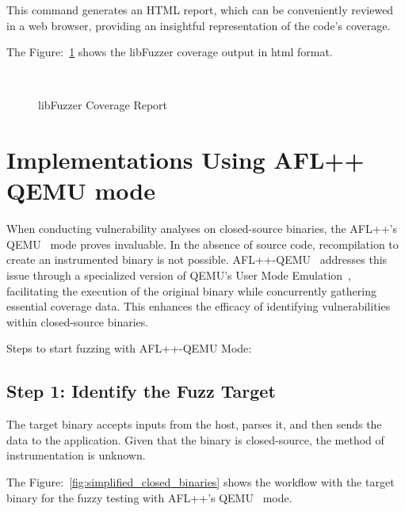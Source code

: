 This command generates an HTML report, which can be conveniently reviewed in a web browser,
providing an insightful representation of the code's coverage.

The Figure:~\ref{fig:llvm_cov_report} shows the libFuzzer coverage output in html format.

\begin{figure}[H]
    \centering
    {}
    \caption{libFuzzer Coverage Report}~\label{fig:llvm_cov_report}
\end{figure}

\section{Implementations Using AFL++ QEMU mode}

When conducting vulnerability analyses on closed-source binaries, the
AFL++'s QEMU~\cite{AFLplusp57:online} mode proves invaluable. In the absence of
source code, recompilation to create an instrumented binary is not possible.
AFL++-QEMU~\cite{AFLplusp57:online} addresses this issue through
a specialized version of QEMU's User Mode Emulation~\cite{bellard2005qemu},
facilitating the execution of the original binary while concurrently gathering essential coverage data.
This enhances the efficacy of identifying vulnerabilities within closed-source
binaries.

Steps to start fuzzing with AFL++-QEMU Mode:

\subsection*{Step 1: Identify the Fuzz Target}

The target binary accepts inputs from the host, parses it, and then sends the
data to the application. Given that the binary is closed-source,
the method of instrumentation is unknown.

The Figure:~\ref{fig:simplified_closed_binaries} shows the workflow with the target binary
for the fuzzy testing with AFL++'s QEMU~\cite{AFLplusp57:online} mode.

